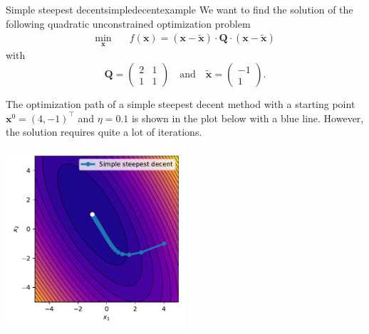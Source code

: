 \begin{example}{Simple steepest decent}{simpledecentexample}
    We want to find the solution of the following quadratic unconstrained optimization problem
    \begin{equation}
        \begin{aligned}
            \min_{\mathbf{x}} \quad & f(\mathbf{x})= (\mathbf{x}-\tilde{\mathbf{x}}) \cdot \mathbf{Q} \cdot (\mathbf{x}-\tilde{\mathbf{x}})
        \end{aligned}
        \label{eq:simpledecent_example}
    \end{equation}
    with 
    \begin{equation}
        \mathbf{Q} = 
        \begin{pmatrix}
        2 & 1 \\
        1 & 1 
        \end{pmatrix}
        \quad \text{and} \quad
        \tilde{\mathbf{x}} = 
        \begin{pmatrix}
        -1\\
        1 
        \end{pmatrix}
        .
    \end{equation}

    The optimization path of a simple steepest decent method with a starting point $\mathbf{x}^0= (4, -1)^\top$ and $\eta=0.1$ is shown in the plot below with a blue line. However, the solution requires quite a lot of iterations.

    \begin{center}
        \includegraphics[width=0.5\textwidth]{figures/simple_decent.pdf}
    \end{center}   
\end{example}


